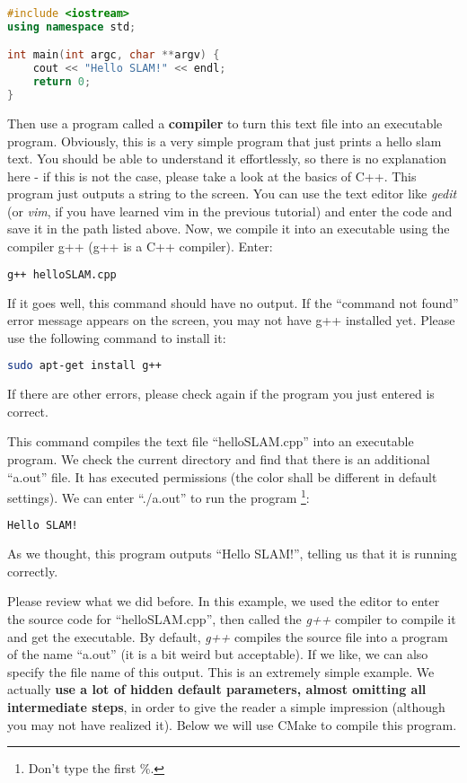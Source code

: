 \begin{lstlisting}[language=C++,caption=slambook2/ch2/helloSLAM.cpp]
#include <iostream>
using namespace std;

int main(int argc, char **argv) {
    cout << "Hello SLAM!" << endl;
    return 0;
}
\end{lstlisting}

Then use a program called a \textbf{compiler} to turn this text file into an executable program. Obviously, this is a very simple program that just prints a hello slam text. You should be able to understand it effortlessly, so there is no explanation here - if this is not the case, please take a look at the basics of C++. This program just outputs a string to the screen. You can use the text editor like \textit{gedit} (or \textit{vim}, if you have learned vim in the previous tutorial) and enter the code and save it in the path listed above. Now, we compile it into an executable using the compiler g++ (g++ is a C++ compiler). Enter:

\begin{lstlisting}[language=sh,caption=Terminal input:]
g++ helloSLAM.cpp
\end{lstlisting}

If it goes well, this command should have no output. If the ``command not found'' error message appears on the screen, you may not have g++ installed yet. Please use the following command to install it:
\begin{lstlisting}[language=sh,caption=Terminal input:]
sudo apt-get install g++
\end{lstlisting}
If there are other errors, please check again if the program you just entered is correct.

This command compiles the text file ``helloSLAM.cpp'' into an executable program. We check the current directory and find that there is an additional ``a.out'' file. It has executed permissions (the color shall be different in default settings). We can enter ``./a.out'' to run the program \footnote{Don't type the first \%. }:

\begin{lstlisting}[language=sh,caption=Terminal input:]
% ./a.out
Hello SLAM!
\end{lstlisting}

As we thought, this program outputs ``Hello SLAM!'', telling us that it is running correctly.

Please review what we did before. In this example, we used the editor to enter the source code for ``helloSLAM.cpp'', then called the \textit{g++} compiler to compile it and get the executable. By default, \textit{g++} compiles the source file into a program of the name ``a.out'' (it is a bit weird but acceptable). If we like, we can also specify the file name of this output. This is an extremely simple example. We actually \textbf{use a lot of hidden default parameters, almost omitting all intermediate steps}, in order to give the reader a simple impression (although you may not have realized it). Below we will use CMake to compile this program.

